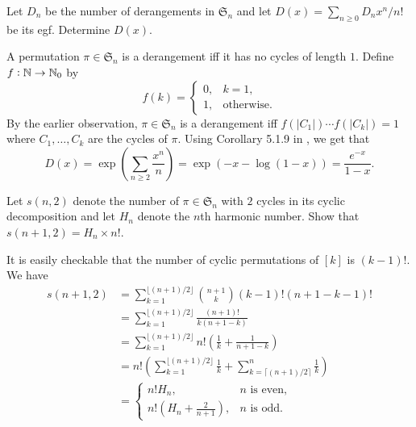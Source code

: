		\begin{problem}
			Let $D_n$ be the number of derangements in $\mathfrak{S}_n$ and let $D(x) = \sum_{n \ge 0} D_n x^n/n!$ be its egf. Determine $D(x)$.
		\end{problem}
		\begin{solution*}
			A permutation $\pi \in \mathfrak{S}_n$ is a derangement iff it has no cycles of length $1$. Define $f : \mathbb{N} \to \mathbb{N}_0$ by
			\[ f(k) = \begin{cases} 0 , & k = 1, \\ 1 , & \text{otherwise.} \end{cases} \]
			By the earlier observation, $\pi \in \mathfrak{S}_n$ is a derangement iff $f(|C_1|)\cdots f(|C_k|) = 1$ where $C_1,\ldots,C_k$ are the cycles of $\pi$.
			Using Corollary 5.1.9 in \cite{ec2}, we get that
			\[ D(x) = \exp \left(\sum_{n \ge 2} \frac{x^n}{n}\right) = \exp \left( -x - \log(1-x) \right) = \frac{e^{-x}}{1-x} . \]
		\end{solution*}

		\begin{problem}
			Let $s(n,2)$ denote the number of $\pi \in \mathfrak{S}_n$ with $2$ cycles in its cyclic decomposition and let $H_n$ denote the $n$th harmonic number. Show that $s(n+1,2) = H_n \times n!$.
		\end{problem}
		\begin{solution*}
			It is easily checkable that the number of cyclic permutations of $[k]$ is $(k-1)!$. We have
			\begin{align*}
				s(n+1,2) &= \sum_{k=1}^{\lfloor (n+1)/2 \rfloor} \binom{n+1}{k} (k-1)! (n+1-k-1)! \\
					&= \sum_{k=1}^{\lfloor (n+1)/2 \rfloor} \frac{(n+1)!}{k(n+1-k)} \\
					&= \sum_{k=1}^{\lfloor (n+1)/2 \rfloor} n! \left( \frac{1}{k} + \frac{1}{n+1-k} \right) \\
					&= n! \left(\sum_{k=1}^{\lfloor (n+1)/2 \rfloor} \frac{1}{k} + \sum_{k=\lceil (n+1)/2 \rceil}^{n} \frac{1}{k} \right) \\
					&= \begin{cases} n!H_n, & \text{$n$ is even}, \\ n! (H_n + \frac{2}{n+1}), & \text{$n$ is odd.} \end{cases} 
			\end{align*}
		\end{solution*}


